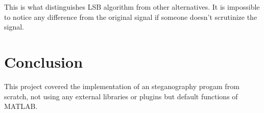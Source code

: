 \documentclass[twocolumns]{IEEEtran}
\begin{document}
	This is what distinguishes LSB algorithm from other alternatives. It is impossible to notice any difference from the original signal if someone doesn't scrutinize the signal.  
	
	\section{Conclusion}
	This project covered the implementation of an steganography progam from scratch, not using any external libraries or plugins but default functions of MATLAB.
	
	
	
	
	
\end{document}
